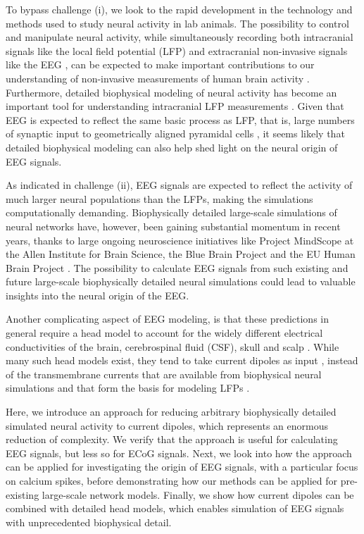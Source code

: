 \documentclass[preprint,10pt,authoryear]{elsarticle}
\newcommand{\hlp}[2][Purple]{ {\sethlcolor{#1} \hl{#2}} }
\newcommand{\sntxt}[1]{{\color{NavyBlue}#1}}
\newcommand{\tvntxt}[1]{{\color{Emerald}#1}}
\newcommand{\gen}[1]{\color{white}{\hlp{GTE: #1 }}\color{black}}
\begin{document}
To bypass challenge (i), we look to the rapid development in the technology and methods used to study neural activity in lab animals. The possibility to control and manipulate neural activity, while simultaneously recording both intracranial signals like the local field potential (LFP) \citep{Einevoll2007, Blomquist2009} and extracranial non-invasive signals like the EEG \citep{BRUYNS2017}, can be expected to make important contributions to our understanding of non-invasive measurements of human brain activity \citep{SILVA2013, Uhlirova2016, COHEN2017, Pesaran2018}. 
Furthermore, detailed biophysical modeling of neural activity has become an important tool for understanding intracranial LFP measurements \citep{EINEVOLL2013REVIEW, Pesaran2018}. Given that EEG is expected to reflect the same basic process as LFP, that is, large numbers of synaptic input to geometrically aligned pyramidal cells \citep{NUNEZ2006, Pesaran2018, BUZSAKI2012}, 
it seems likely that detailed biophysical modeling can also help shed light on the neural origin of EEG signals.

As indicated in challenge (ii), EEG signals are expected to reflect the activity of much larger neural populations than the LFPs, making the simulations computationally demanding. Biophysically detailed large-scale simulations of neural networks have, however, been gaining substantial momentum in recent years, thanks to large ongoing neuroscience initiatives like Project MindScope at the Allen Institute for Brain Science, the Blue Brain Project
and the EU Human Brain Project \citep{EINEVOLL2019}. The possibility to calculate EEG signals from such existing and future large-scale biophysically detailed neural simulations could lead to valuable insights into the neural origin of the EEG.

Another complicating aspect of EEG modeling, is that these predictions in general require a head model to account for the widely different electrical conductivities of the brain, cerebrospinal fluid (CSF), skull and scalp \citep{NUNEZ2006, Ilmoniemi2019}. While many such head models exist, they tend to take current dipoles as input \citep{NUNEZ2006, Pesaran2018}, instead of the transmembrane currents that are available from biophysical neural simulations and that form the basis for modeling LFPs \citep{EINEVOLL2013BOOKCHAPTER}. 

Here, we introduce an approach for reducing arbitrary biophysically detailed simulated neural activity to current dipoles, \sntxt{which represents an enormous reduction of complexity. We verify that the approach is useful} for calculating EEG signals\sntxt{, but less so for ECoG signals. Next, we look into} how the approach can be applied for investigating the origin of EEG signals, \tvntxt{with a particular focus on calcium spikes,} before demonstrating how our methods can be applied for pre-existing large-scale network models. Finally, we show how current dipoles can be combined with \tvntxt{detailed} head models, which enables simulation of EEG signals with unprecedented biophysical detail.  
\end{document}
